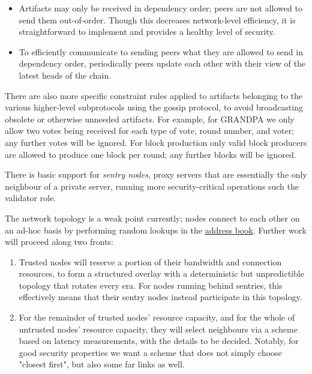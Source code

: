 \begin{itemize}
\item Artifacts may only be received in dependency order; peers are not allowed to send them out-of-order. Though this decreases network-level efficiency, it is straightforward to implement and provides a healthy level of security.
\item To efficiently communicate to sending peers what they are allowed to send in dependency order, periodically peers update each other with their view of the latest heads of the chain.
\end{itemize}

There are also more specific constraint rules applied to artifacts belonging to the various higher-level subprotocols using the gossip protocol, to avoid broadcasting obsolete or otherwise unneeded artifacts. For example, for GRANDPA we only allow two votes being received for each type of vote, round number, and voter; any further votes will be ignored. For block production only valid block producers are allowed to produce one block per round; any further blocks will be ignored.

There is basic support for \emph{sentry nodes}, proxy servers that are essentially the only neighbour of a private server, running more security-critical operations such the validator role.

The network topology is a weak point currently; nodes connect to each other on an ad-hoc basis by performing random lookups in the \hyperref[sec:net_lowlevel]{address book}. Further work will proceed along two fronts:

\begin{enumerate}
\item Trusted nodes will reserve a portion of their bandwidth and connection resources, to form a structured overlay with a deterministic but unpredictible topology that rotates every era. For nodes running behind sentries, this effectively means that their sentry nodes instead participate in this topology.

\item For the remainder of trusted nodes' resource capacity, and for the whole of untrusted nodes' resource capacity, they will select neighbours via a scheme based on latency measurements, with the details to be decided. Notably, for good security properties we want a scheme that does not simply choose "closest first", but also some far links as well.
\end{enumerate}

